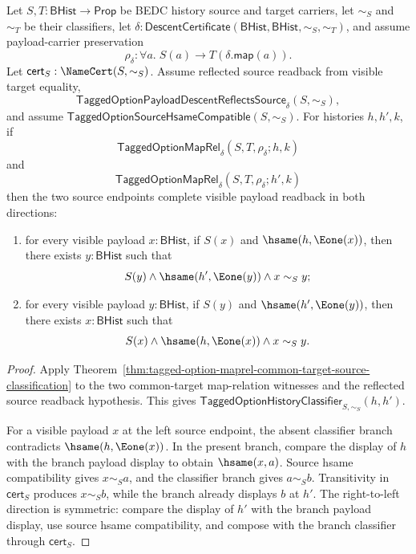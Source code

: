 \begin{theorem}
\label{thm:tagged-option-maprel-common-target-visible-source-completion}
Let $S,T:\mathsf{BHist}\to\mathsf{Prop}$ be BEDC history source and target
carriers, let $\sim_S$ and $\sim_T$ be their classifiers, let
$\delta:\mathsf{DescentCertificate}(\mathsf{BHist},\mathsf{BHist},\sim_S,\sim_T)$,
and assume payload-carrier preservation
$$
\rho_{\delta}:\forall a.\;S(a)\to T(\delta.\mathsf{map}(a)).
$$
Let $\mathsf{cert}_S:\NameCert(S,\sim_S)$. Assume reflected source readback
from visible target equality,
$$
\mathsf{TaggedOptionPayloadDescentReflectsSource}_{\delta}(S,\sim_S),
$$
and assume $\mathsf{TaggedOptionSourceHsameCompatible}(S,\sim_S)$. For histories
$h,h',k$, if
$$
\mathsf{TaggedOptionMapRel}_{\delta}(S,T,\rho_{\delta};h,k)
$$
and
$$
\mathsf{TaggedOptionMapRel}_{\delta}(S,T,\rho_{\delta};h',k)
$$
then the two source endpoints complete visible payload readback in both
directions:
\begin{enumerate}
  \item for every visible payload $x:\mathsf{BHist}$, if $S(x)$ and
  $\hsame(h,\Eone(x))$, then there exists $y:\mathsf{BHist}$ such that
  $$
  S(y)\land\hsame(h',\Eone(y))\land x\sim_S y;
  $$
  \item for every visible payload $y:\mathsf{BHist}$, if $S(y)$ and
  $\hsame(h',\Eone(y))$, then there exists $x:\mathsf{BHist}$ such that
  $$
  S(x)\land\hsame(h,\Eone(x))\land x\sim_S y.
  $$
\end{enumerate}
\end{theorem}
\begin{proof}
Apply Theorem~\ref{thm:tagged-option-maprel-common-target-source-classification}
to the two common-target map-relation witnesses and the reflected source
readback hypothesis. This gives
$\mathsf{TaggedOptionHistoryClassifier}_{S,\sim_S}(h,h')$.

For a visible payload $x$ at the left source endpoint, the absent classifier
branch contradicts $\hsame(h,\Eone(x))$. In the present branch, compare the
display of $h$ with the branch payload display to obtain $\hsame(x,a)$. Source
hsame compatibility gives $x\sim_S a$, and the classifier branch gives
$a\sim_S b$. Transitivity in $\mathsf{cert}_S$ produces $x\sim_S b$, while the
branch already displays $b$ at $h'$. The right-to-left direction is symmetric:
compare the display of $h'$ with the branch payload display, use source hsame
compatibility, and compose with the branch classifier through
$\mathsf{cert}_S$.
\end{proof}

